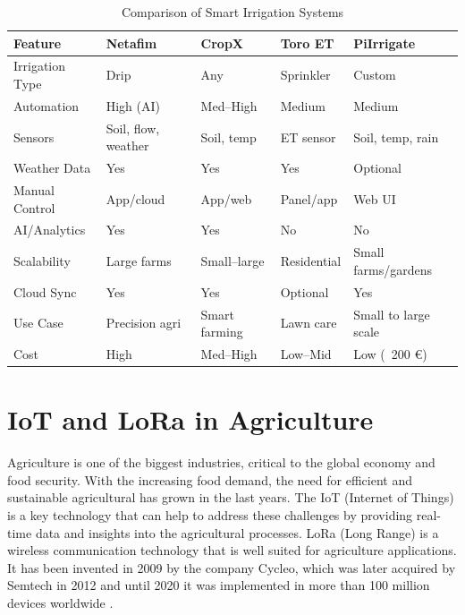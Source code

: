 \begin{table}[ht]
\centering
\begin{tabular}{|p{3.2cm}|p{3.2cm}|p{3.2cm}|p{3.2cm}|p{3.2cm}|}
\hline
\textbf{Feature} & \textbf{Netafim} & \textbf{CropX} & \textbf{Toro ET} & \textbf{PiIrrigate} \\
\hline
Irrigation Type & Drip & Any & Sprinkler & Custom \\
\hline
Automation & High (AI) & Med–High & Medium & Medium \\
\hline
Sensors & Soil, flow, weather & Soil, temp & ET sensor & Soil, temp, rain \\
\hline
Weather Data & Yes & Yes & Yes & Optional \\
\hline
Manual Control & App/cloud & App/web & Panel/app & Web UI \\
\hline
AI/Analytics & Yes & Yes & No & No \\
\hline
Scalability & Large farms & Small–large & Residential & Small farms/gardens \\
\hline
Cloud Sync & Yes & Yes & Optional & Yes \\
\hline
Use Case & Precision agri & Smart farming & Lawn care & Small to large scale\\
\hline
Cost & High & Med–High & Low–Mid & Low (~200 €) \\
\hline
\end{tabular}
\caption{Comparison of Smart Irrigation Systems}
\label{tab:irrigation_comparison}
\end{table}

\section{IoT and LoRa in Agriculture}
Agriculture is one of the biggest industries, critical to the global economy and food security. With the increasing food 
demand, the need for efficient and sustainable agricultural has grown in the last years. The IoT (Internet of Things) is
a key technology that can help to address these challenges by providing real-time data and 
insights into the agricultural processes. LoRa (Long Range) is a wireless communication technology 
that is well suited for agriculture applications. It has been invented in 2009  by the company Cycleo, 
which was later acquired by Semtech in 2012 and until 2020 it was implemented in more than 100 million devices worldwide
\cite{LoRaHistory}.

